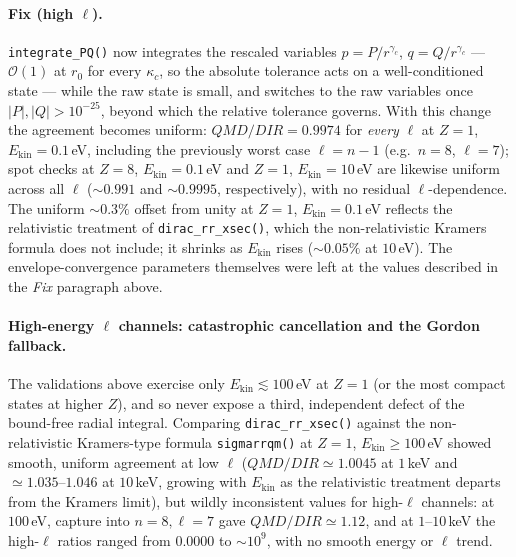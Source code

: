 \documentclass[11pt,a4paper]{article}
\begin{document}
\paragraph{Fix (high $\ell$).} {\tt integrate\_PQ()} now integrates the
rescaled variables $p=P/r^{\gamma_{c}}$, $q=Q/r^{\gamma_{c}}$ ---
$\mathcal{O}(1)$ at $r_{0}$ for every $\kappa_{c}$, so the absolute
tolerance acts on a well-conditioned state --- while the raw state is
small, and switches to the raw variables once $|P|,|Q|>10^{-25}$,
beyond which the relative tolerance governs.  With this change the
agreement becomes uniform: $QMD/DIR=0.9974$ for \emph{every} $\ell$
at $Z=1$, $E_{\mathrm{kin}}=0.1$\,eV, including the previously worst
case $\ell=n-1$ (e.g.\ $n=8$, $\ell=7$); spot checks at $Z=8$,
$E_{\mathrm{kin}}=0.1$\,eV and $Z=1$, $E_{\mathrm{kin}}=10$\,eV are
likewise uniform across all $\ell$ ($\sim0.991$ and $\sim0.9995$,
respectively), with no residual $\ell$-dependence.  The uniform
$\sim0.3\%$ offset from unity at $Z=1$, $E_{\mathrm{kin}}=0.1$\,eV
reflects the relativistic treatment of {\tt dirac\_rr\_xsec()}, which
the non-relativistic Kramers formula does not include; it shrinks as
$E_{\mathrm{kin}}$ rises ($\sim0.05\%$ at $10$\,eV).  The
envelope-convergence parameters themselves were left at the values
described in the \emph{Fix} paragraph above.

\paragraph{High-energy $\ell$ channels: catastrophic cancellation and the Gordon fallback.}
The validations above exercise only $E_{\mathrm{kin}}\lesssim100$\,eV at
$Z=1$ (or the most compact states at higher $Z$), and so never expose a
third, independent defect of the bound-free radial integral. Comparing
{\tt dirac\_rr\_xsec()} against the non-relativistic Kramers-type
formula {\tt sigmarrqm()} at $Z=1$, $E_{\mathrm{kin}}\ge100$\,eV showed
smooth, uniform agreement at low $\ell$ ($QMD/DIR\simeq1.0045$ at
$1$\,keV and $\simeq1.035$--$1.046$ at $10$\,keV, growing with
$E_{\mathrm{kin}}$ as the relativistic treatment departs from the
Kramers limit), but wildly inconsistent values for high-$\ell$ channels:
at $100$\,eV, capture into $n=8,\ell=7$ gave $QMD/DIR\simeq1.12$, and at
$1$--$10$\,keV the high-$\ell$ ratios ranged from $0.0000$ to
$\sim10^{9}$, with no smooth energy or $\ell$ trend.
\end{document}
